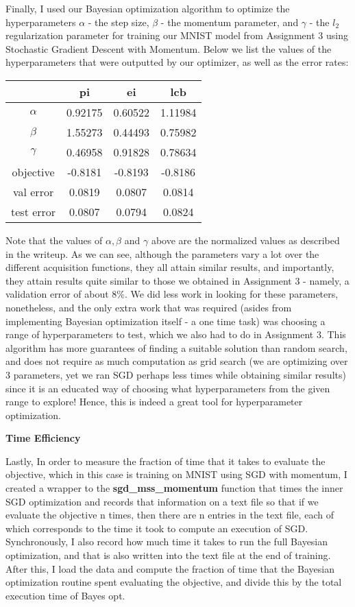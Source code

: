 \documentclass[10pt]{article}
\begin{document}
\begin{multicols}{2}
Finally, I used our Bayesian optimization algorithm to optimize the hyperparameters $\alpha$ - the step size, $\beta$ - the momentum parameter, and $\gamma$ - the $l_2$ regularization parameter for training our MNIST model from Assignment 3 using Stochastic Gradient Descent with Momentum. Below we list the values of the hyperparameters that were outputted by our optimizer, as well as the error rates:
\begin{center}
    \begin{tabular}{|c|c|c|c|} \hline
         & pi & ei & lcb \\ \hline 
        $\alpha$ & 0.92175 & 0.60522 & 1.11984 \\ \hline
        $\beta$ & 1.55273 & 0.44493 & 0.75982  \\ \hline 
        $\gamma$ & 0.46958 & 0.91828 & 0.78634 \\ \hline 
        objective & -0.8181 & -0.8193 & -0.8186 \\ \hline 
        val error & 0.0819 & 0.0807 & 0.0814 \\ \hline
        test error & 0.0807 & 0.0794 & 0.0824 \\  \hline 
    \end{tabular}
\end{center}
Note that the values of $\alpha, \beta$ and $\gamma$ above are the normalized values as described in the writeup. As we can see, although the parameters vary a lot over the different acquisition functions, they all attain similar results, and importantly, they attain results quite similar to those we obtained in Assignment 3 - namely, a validation error of about 8\%. We did less work in looking for these parameters, nonetheless, and the only extra work that was required (asides from implementing Bayesian optimization itself - a one time task) was choosing a range of hyperparameters to test, which we also had to do in Assignment 3. This algorithm has more guarantees of finding a suitable solution than random search, and does not require as much computation as grid search (we are optimizing over 3 parameters, yet we ran SGD perhaps less times while obtaining similar results) since it is an educated way of choosing what hyperparameters from the given range to explore! Hence, this is indeed a great tool for hyperparameter optimization.


\textbf{Time Efficiency}


Lastly, In order to measure the fraction of time that it takes to evaluate the objective, which in this case is training on MNIST using SGD with momentum, I created a wrapper to the \textbf{sgd\_mss\_momentum} function that times the inner SGD optimization and records that information on a text file so that if we evaluate the objective n times, then there
are n entries in the text file, each of which corresponds to the time it took to compute an execution of SGD. Synchronously, I also record how much time it takes to run the full Bayesian optimization, and that is also written into the text file at the end of training. After this, I load the data and compute the fraction of time
that the Bayesian optimization routine spent evaluating the objective, and divide this by the total execution time of Bayes opt. 


\end{multicols}
\end{document}
